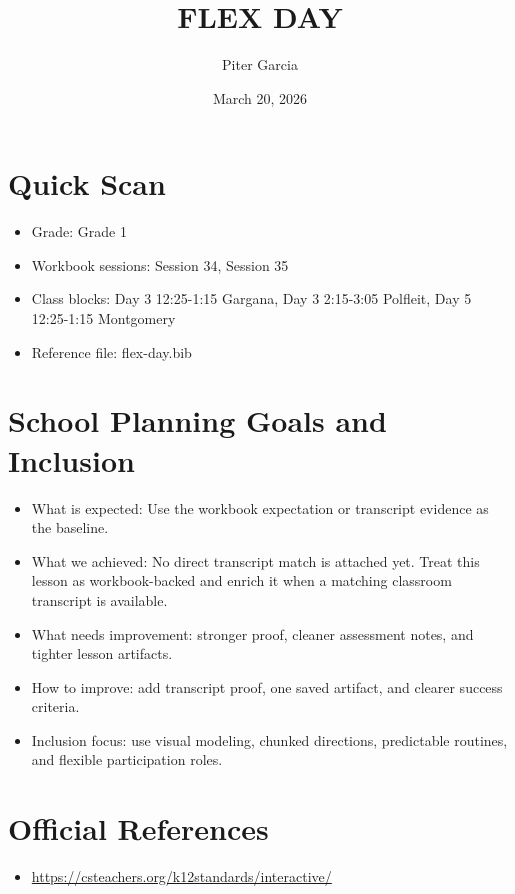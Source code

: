 \documentclass[11pt]{article}
\title{FLEX DAY}
\author{Piter Garcia}
\date{March 20, 2026}
\begin{document}
\maketitle
\section*{Quick Scan}
\begin{itemize}[leftmargin=*]
\item Grade: Grade 1
\item Workbook sessions: Session 34, Session 35
\item Class blocks: Day 3 12:25-1:15 Gargana, Day 3 2:15-3:05 Polfleit, Day 5 12:25-1:15 Montgomery
\item Reference file: flex-day.bib
\end{itemize}
\section*{School Planning Goals and Inclusion}
\begin{itemize}[leftmargin=*]
\item What is expected: Use the workbook expectation or transcript evidence as the baseline.
\item What we achieved: No direct transcript match is attached yet. Treat this lesson as workbook-backed and enrich it when a matching classroom transcript is available.
\item What needs improvement: stronger proof, cleaner assessment notes, and tighter lesson artifacts.
\item How to improve: add transcript proof, one saved artifact, and clearer success criteria.
\item Inclusion focus: use visual modeling, chunked directions, predictable routines, and flexible participation roles.
\end{itemize}
\section*{Official References}
\begin{itemize}[leftmargin=*]
\item \url{https://csteachers.org/k12standards/interactive/}

\end{itemize}
\end{document}
